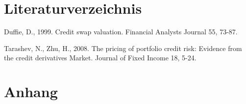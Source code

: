 \documentclass[a4paper,12pt]{scrartcl}
\begin{document}




\section{Literaturverzeichnis}

Duffie, D., 1999. Credit swap valuation. Financial Analysts Journal 55, 73-87.

Tarashev, N., Zhu, H., 2008. The pricing of portfolio credit risk: Evidence from the credit derivatives Market. Journal of Fixed Income 18, 5-24.
\newpage

\section{Anhang}
\end{document}

